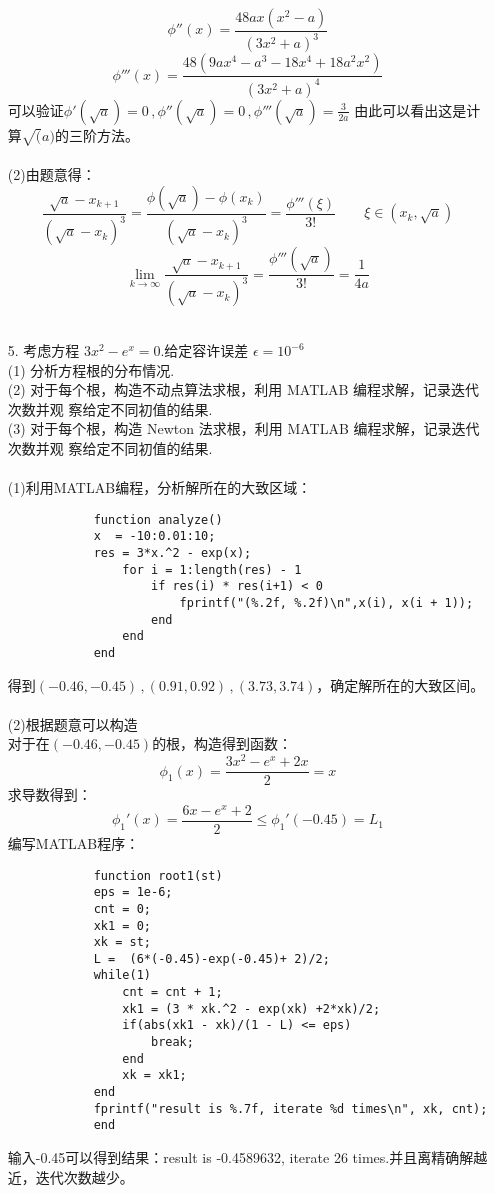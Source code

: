 \documentclass{article}
\begin{document}
\begin{itemize}
		$$\phi''(x) = \frac{48ax(x^2 - a)}{(3x^2 + a)^3}$$
		$$\phi'''(x) = \frac{48(9ax^4 - a^3 - 18x^4 + 18a^2x^2)}{(3x^2 + a)^4}$$
		可以验证$\phi'(\sqrt{a}) = 0\,,\phi''(\sqrt{a}) = 0\,,\phi'''(\sqrt{a}) = \frac{3}{2a}$
		由此可以看出这是计算$\sqrt(a)$的三阶方法。\\\\
		(2)由题意得：
		$$\frac{\sqrt{a} - x_{k+1}}{(\sqrt{a} - x_k)^3} = \frac{\phi(\sqrt{a}) -\phi(x_{k})}{(\sqrt{a} - x_k)^3}= \frac{\phi'''(\xi)}{3!} \qquad \xi \in (x_k,\sqrt{a}) $$
		$$\lim\limits_{k \rightarrow \infty}\frac{\sqrt{a} - x_{k+1}}{(\sqrt{a} - x_{k})^3} = \frac{\phi'''(\sqrt{a})}{3!} = \frac{1}{4a}$$\\
		\item[5.]考虑方程 $3x^2 − e^x = 0. $给定容许误差 $\epsilon = 10^{−6}$\\
		(1) 分析方程根的分布情况.\\
		(2) 对于每个根，构造不动点算法求根，利用 MATLAB 编程求解，记录迭代次数并观
		察给定不同初值的结果.
\\
		(3) 对于每个根，构造 Newton 法求根，利用 MATLAB 编程求解，记录迭代次数并观
		察给定不同初值的结果.\\\\
		
		(1)利用MATLAB编程，分析解所在的大致区域：
		\begin{lstlisting}
			function analyze()
			x  = -10:0.01:10;
			res = 3*x.^2 - exp(x);
				for i = 1:length(res) - 1
					if res(i) * res(i+1) < 0
						fprintf("(%.2f, %.2f)\n",x(i), x(i + 1));
					end
				end
			end
		\end{lstlisting}
		得到$(-0.46, -0.45)\,,(0.91, 0.92)\,,(3.73, 3.74)$，确定解所在的大致区间。\\
		\\
		(2)根据题意可以构造\\
		对于在$(-0.46, -0.45)$的根，构造得到函数：
		$$\phi_1(x) = \frac{3x^2 - e^x + 2x}{2} = x$$
		求导数得到：
		$$\phi_1'(x) = \frac{6x - e^x +2}{2} \le \phi_{1}'(-0.45) = L_1$$
		编写MATLAB程序：
		\begin{lstlisting}
			function root1(st)
			eps = 1e-6;
			cnt = 0;
			xk1 = 0;
			xk = st;
			L =  (6*(-0.45)-exp(-0.45)+ 2)/2;
			while(1)
				cnt = cnt + 1;
				xk1 = (3 * xk.^2 - exp(xk) +2*xk)/2;
				if(abs(xk1 - xk)/(1 - L) <= eps)
					break;
				end
				xk = xk1;
			end
			fprintf("result is %.7f, iterate %d times\n", xk, cnt);
			end
		\end{lstlisting}
		输入-0.45可以得到结果：result is -0.4589632, iterate 26 times.并且离精确解越近，迭代次数越少。\\\\
		

\end{itemize}
\end{document}
